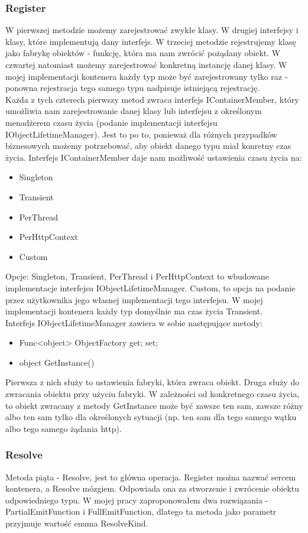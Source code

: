 \documentclass[12pt]{article}
\begin{document}
\subsubsection{Register}
W pierwszej metodzie możemy zarejestrować zwykłe klasy. W drugiej interfejsy i klasy, które implementują dany interfejs. W trzeciej metodzie rejestrujemy klasę jako fabrykę obiektów - funkcję, która ma nam zwrócić pożądany obiekt. W czwartej natomiast możemy zarejestrować konkretną instancję danej klasy. W mojej implementacji kontenera każdy typ może być zarejestrowany tylko raz - ponowna rejestracja tego samego typu nadpisuje istniejącą rejestrację.\\
Każda z tych czterech pierwszy metod zwraca interfejs IContainerMember, który umożliwia nam zarejestrowanie danej klasy lub interfejsu z określonym menadżerem czasu życia (podanie implementacji interfejsu IObjectLifetimeManager). Jest to po to, ponieważ dla różnych przypadków biznesowych możemy potrzebować, aby obiekt danego typu miał konretny czas życia. Interfejs IContainerMember daje nam możliwość ustawienia czasu życia na:
\begin{itemize}
	\item Singleton
	\item Transient
	\item PerThread
	\item PerHttpContext
	\item Custom
\end{itemize}
Opcje: Singleton, Transient, PerThread i PerHttpContext to wbudowane implementacje interfejsu IObjectLifetimeManager. Custom, to opcja na podanie przez użytkownika jego własnej implementacji tego interfejsu. W mojej implementacji kontenera każdy typ domyślnie ma czas życia Transient.\\
Interfejs IObjectLifetimeManager zawiera w sobie następujące metody:
\begin{itemize}
	\item  Func<object> ObjectFactory { get; set; }
	\item object GetInstance()
\end{itemize}
Pierwsza z nich służy to ustawienia fabryki, która zwraca obiekt. Druga służy do zwracania obiektu przy użyciu fabryki. W zależności od konkretnego czasu życia, to obiekt zwracany z metody GetInstance może być zawsze ten sam, zawsze różny albo ten sam tylko dla określonych sytuacji (np. ten sam dla tego samego wątku albo tego samego żądania http).

\subsubsection{Resolve}
Metoda piąta - Resolve, jest to główna operacja. Register można nazwać sercem kontenera, a Resolve mózgiem. Odpowiada ona za stworzenie i zwrócenie obiektu odpowiedniego typu. W mojej pracy zaproponowałem dwa rozwiązania - PartialEmitFunction i FullEmitFunction, dlatego ta metoda jako parametr przyjmuje wartość enuma ResolveKind.\\
\end{document}
